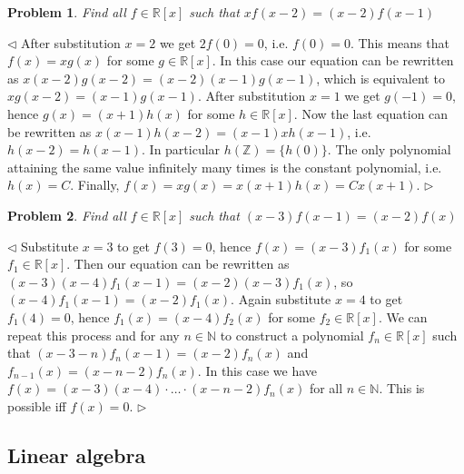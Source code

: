 \documentclass[12pt]{article}
\newtheorem{problem}{Problem}[subsection]
\newenvironment{solution}{\par $\triangleleft$}{$\triangleright$}
\begin{document}
\begin{problem} Find all $f\in \mathbb{R}[x]$ such that $xf(x-2)=(x-2)f(x-1)$
\end{problem}
\begin{solution} After substitution $x=2$ we get $2f(0)=0$, i.e. $f(0)=0$. This
    means that $f(x)=xg(x)$ for some $g\in\mathbb{R}[x]$. In this case our
    equation can be rewritten as $x(x-2)g(x-2)=(x-2)(x-1)g(x-1)$, which is
    equivalent to $xg(x-2)=(x-1)g(x-1)$. After substitution $x=1$ we get
    $g(-1)=0$, hence $g(x)=(x+1)h(x)$ for some $h\in\mathbb{R}[x]$. Now the last
    equation can be rewritten as $x(x-1)h(x-2)=(x-1)xh(x-1)$, i.e.
    $h(x-2)=h(x-1)$. In particular $h(\mathbb{Z})=\{h(0)\}$. The only polynomial
    attaining the same value infinitely many times is the constant polynomial,
    i.e. $h(x)=C$. Finally, $f(x)=xg(x)=x(x+1)h(x)=Cx(x+1)$.
\end{solution}

\begin{problem} Find all $f\in \mathbb{R}[x]$ such that $(x-3)f(x-1)=(x-2)f(x)$
\end{problem}
\begin{solution} Substitute $x=3$ to get $f(3)=0$, hence $f(x)=(x-3)f_1(x)$ for
    some $f_1\in\mathbb{R}[x]$. Then our equation can be rewritten as
    $(x-3)(x-4)f_1(x-1)=(x-2)(x-3)f_1(x)$, so $(x-4)f_1(x-1)=(x-2)f_1(x)$. Again
    substitute $x=4$ to get $f_1(4)=0$, hence $f_1(x)=(x-4)f_2(x)$ for some
    $f_2\in\mathbb{R}[x]$. We can repeat this process and for any
    $n\in\mathbb{N}$ to construct a polynomial $f_n\in\mathbb{R}[x]$ such that
    $(x-3-n)f_n(x-1)=(x-2)f_n(x)$ and $f_{n-1}(x)=(x-n-2)f_{n}(x)$. In this case
    we have $f(x)=(x-3)(x-4)\cdot\ldots\cdot(x-n-2)f_n(x)$  %
    for all $n\in\mathbb{N}$. This is possible iff $f(x)=0$.
\end{solution}





















\newpage

\subsection{Linear algebra}
\end{document}
